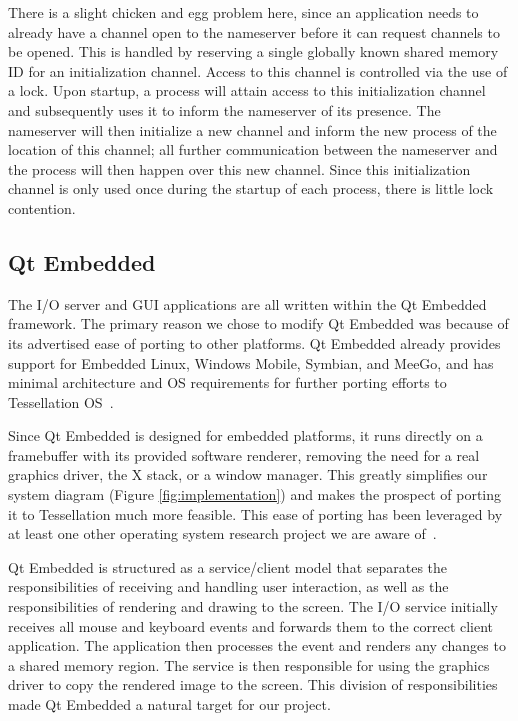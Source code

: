 \documentclass[letterpaper,twocolumn,11pt]{article}
\begin{document}
There is a slight chicken and egg problem here, since an application needs to already have a channel open to the nameserver before it can request channels to be opened. This is handled by reserving a single globally known shared memory ID for an initialization channel. Access to this channel is controlled via the use of a lock. Upon startup, a process will attain access to this initialization channel and subsequently uses it to inform the nameserver of its presence. The nameserver will then initialize a new channel and inform the new process of the location of this channel; all further communication between the nameserver and the process will then happen over this new channel. Since this initialization channel is only used once during the startup of each process, there is little lock contention.

\subsection{Qt Embedded}

The I/O server and GUI applications are all written within the Qt Embedded framework. The primary reason we chose to modify Qt Embedded was because of its advertised ease of porting to other platforms. Qt Embedded already provides support for Embedded Linux, Windows Mobile, Symbian, and MeeGo, and has minimal architecture and OS requirements for further porting efforts to Tessellation OS~\cite{qtembedded}.

Since Qt Embedded is designed for embedded platforms, it runs directly on a framebuffer with its provided software renderer, removing the need for a real graphics driver, the X stack, or a window manager. This greatly simplifies our system diagram (Figure \ref{fig:implementation}) and makes the prospect of porting it to Tessellation much more feasible. This ease of porting has been leveraged by at least one other operating system research project we are aware of~\cite{ibos}. 

Qt Embedded is structured as a service/client model that separates the responsibilities of receiving and handling user interaction, as well as the responsibilities of rendering and drawing to the screen. The I/O service initially receives all mouse and keyboard events and forwards them to the correct client application. The application then processes the event and renders any changes to a shared memory region. The service is then responsible for using the graphics driver to copy the rendered image to the screen. This division of responsibilities made Qt Embedded a natural target for our project.
\end{document}

